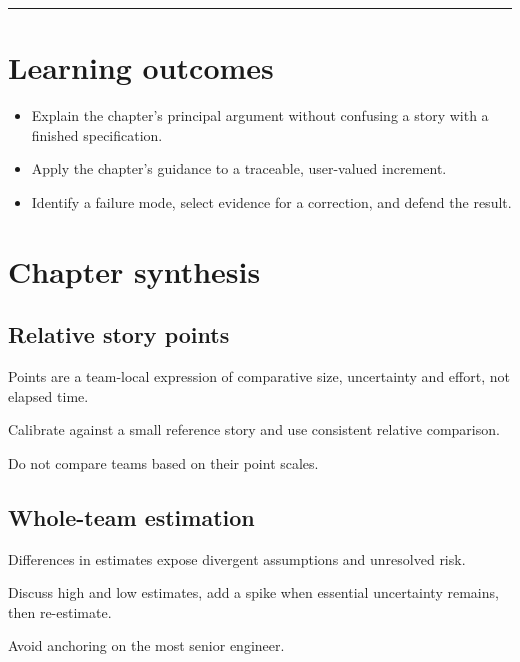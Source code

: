 \documentclass[11pt,letterpaper]{article}
\begin{document}
\tableofcontents\medskip\noindent\rule{\linewidth}{0.4pt}\medskip
\section{Learning outcomes}
\begin{itemize}[leftmargin=*,itemsep=2pt]
\item Explain the chapter's principal argument without confusing a story with a finished specification.
\item Apply the chapter's guidance to a traceable, user-valued increment.
\item Identify a failure mode, select evidence for a correction, and defend the result.
\end{itemize}
\section{Chapter synthesis}
\subsection{Relative story points}
Points are a team-local expression of comparative size, uncertainty and effort, not elapsed time.

\begin{tcolorbox}[colback=tealback,colframe=navy,title={Engineering translation},breakable]
Calibrate against a small reference story and use consistent relative comparison.

\end{tcolorbox}
\begin{tcolorbox}[colback=amberback,colframe=navy,title={Failure mode to watch},breakable]
Do not compare teams based on their point scales.

\end{tcolorbox}
\subsection{Whole-team estimation}
Differences in estimates expose divergent assumptions and unresolved risk.

\begin{tcolorbox}[colback=tealback,colframe=navy,title={Engineering translation},breakable]
Discuss high and low estimates, add a spike when essential uncertainty remains, then re-estimate.

\end{tcolorbox}
\begin{tcolorbox}[colback=amberback,colframe=navy,title={Failure mode to watch},breakable]
Avoid anchoring on the most senior engineer.

\end{tcolorbox}
\end{document}
